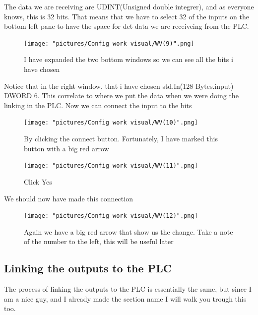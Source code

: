 \documentclass{article}
\begin{document}
\newpage

The data we are receiving are UDINT(Unsigned double integrer), and as everyone knows, this is 32 bits. That means that we have to select 32 of the inputs on the bottom left pane to have the space for det data we are receiveing from the PLC. 

\begin{figure}[!h]
    \centering
    \texttt{[image: "pictures/Config work visual/WV(9)".png]}
    \caption{I have expanded the two bottom windows so we can see all the bits i have chosen}
    \label{fig:my_label}
\end{figure}

Notice that in the right window, that i have chosen std.In(128 Bytes.input) DWORD 6. This correlate to where we put the data when we were doing the linking in the PLC.
\newpage
Now we can connect the input to the bits


\begin{figure}[!h]
    \centering
    \texttt{[image: "pictures/Config work visual/WV(10)".png]}
    \caption{By clicking the connect button. Fortunately, I have marked this button with a big red arrow}
    \label{fig:my_label}
\end{figure}



\begin{figure}[!h]
    \centering
    \texttt{[image: "pictures/Config work visual/WV(11)".png]}
    \caption{Click Yes}
    \label{fig:my_label}
\end{figure}

\newpage

We should now have made this connection
\begin{figure}[!h]
    \centering
    \texttt{[image: "pictures/Config work visual/WV(12)".png]}
    \caption{Again we have a big red arrow that show us the change. Take a note of the number to the left, this will be useful later}
    \label{fig:my_label}
\end{figure}

\newpage

\subsection{Linking the outputs to the PLC }

The process of linking the outputs to the PLC is essentially the same, but since I am a nice guy, and I already made the section name  I will walk you trough this too. 
\end{document}
